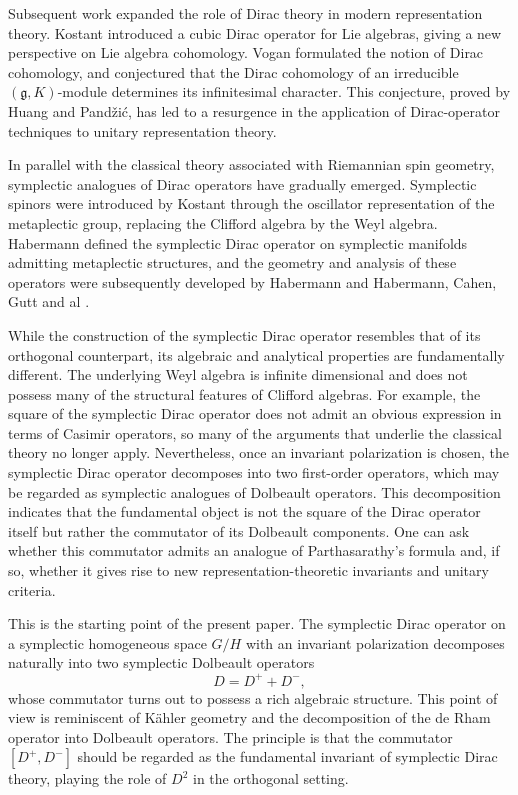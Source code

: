 \documentclass{amsart}[draft,11pt]
\numberwithin{equation}{section}
\theoremstyle{definition}
\begin{document}
\smallskip
Subsequent work expanded the role of Dirac theory in  modern representation theory. Kostant introduced a cubic Dirac operator for Lie algebras, giving a new perspective on Lie algebra cohomology.  Vogan formulated the notion of Dirac cohomology, and conjectured that the Dirac cohomology of an irreducible $(\mathfrak{g},K)$-module determines its infinitesimal character. This conjecture, proved by Huang and Pand\v zi\' c, has led to a resurgence in the application of Dirac-operator techniques to unitary representation theory. 

\smallskip
In parallel with the classical theory associated with Riemannian spin geometry, symplectic analogues of Dirac operators have gradually emerged. Symplectic spinors were introduced by Kostant \cite{kostant1974} through the oscillator representation of the metaplectic group, replacing the Clifford algebra by the Weyl algebra. Habermann \cite{habermann,HH,BHH09}  defined the symplectic Dirac
operator on symplectic manifolds admitting metaplectic structures, and the geometry and analysis of these operators were subsequently developed by Habermann and Habermann, Cahen, Gutt and al \cite{CG2011,CG2013}. 

\smallskip
While the construction of the symplectic Dirac operator resembles that of its orthogonal counterpart, its algebraic and analytical properties are fundamentally different. The underlying Weyl algebra is infinite dimensional and does not possess many of the structural features of  Clifford algebras.
For example, the square of the symplectic Dirac operator does not admit an obvious expression in terms of Casimir operators, so many of the arguments that underlie the classical theory no longer apply. %
Nevertheless, once an invariant polarization is chosen, the
symplectic Dirac operator decomposes into two first-order operators, which may be regarded as symplectic analogues of Dolbeault operators. This decomposition indicates that the fundamental object is not the square of the Dirac operator itself but rather the commutator of
its Dolbeault components. One can ask whether this commutator admits an analogue of Parthasarathy's formula and, if so, whether it gives rise to new representation-theoretic invariants and unitary criteria.

\smallskip
This is the starting point of the present paper. The symplectic Dirac operator on a symplectic homogeneous space $G/H$ with an invariant polarization decomposes naturally into two symplectic Dolbeault operators
\[
D=D^{+}+D^{-},
\]
whose commutator turns out to possess a rich algebraic structure. This point of view is reminiscent of K\"ahler geometry and the decomposition of the de Rham operator into Dolbeault operators. %
The principle is that the commutator
$[D^{+},D^{-}]$
should be regarded as the fundamental invariant of symplectic Dirac theory, playing the role of $D^{2}$ in the orthogonal setting.
\end{document}

